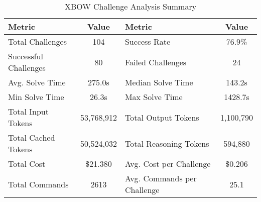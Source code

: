 
\begin{table*}[t]
\centering
\caption{XBOW Challenge Analysis Summary}
\label{tab:xbow_summary}
\begin{tabular}{@{}lc@{\hspace{2cm}}lc@{}}
\toprule
\textbf{Metric} & \textbf{Value} & \textbf{Metric} & \textbf{Value} \\
\midrule
Total Challenges & 104 & Success Rate & 76.9\% \\
Successful Challenges & 80 & Failed Challenges & 24 \\
\midrule
Avg. Solve Time & 275.0s & Median Solve Time & 143.2s \\
Min Solve Time & 26.3s & Max Solve Time & 1428.7s \\
\midrule
Total Input Tokens & 53,768,912 & Total Output Tokens & 1,100,790 \\
Total Cached Tokens & 50,524,032 & Total Reasoning Tokens & 594,880 \\
\midrule
Total Cost & \$21.380 & Avg. Cost per Challenge & \$0.206 \\
Total Commands & 2613 & Avg. Commands per Challenge & 25.1 \\
\bottomrule
\end{tabular}
\end{table*}
